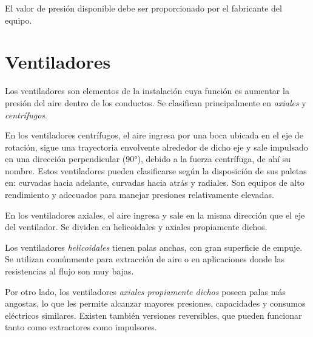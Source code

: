 El valor de presión disponible debe ser proporcionado por el fabricante del equipo.

\section{Ventiladores}

Los ventiladores son elementos de la instalación cuya función es aumentar la presión del aire dentro de los conductos. Se clasifican principalmente en \emph{axiales} y \emph{centrífugos}.

En los ventiladores centrífugos, el aire ingresa por una boca ubicada en el eje de rotación, sigue una trayectoria envolvente alrededor de dicho eje y sale impulsado en una dirección perpendicular (90°), debido a la fuerza centrífuga, de ahí su nombre. Estos ventiladores pueden clasificarse según la disposición de sus paletas en: curvadas hacia adelante, curvadas hacia atrás y radiales. Son equipos de alto rendimiento y adecuados para manejar presiones relativamente elevadas.

En los ventiladores axiales, el aire ingresa y sale en la misma dirección que el eje del ventilador. Se dividen en helicoidales y axiales propiamente dichos.

Los ventiladores \emph{helicoidales} tienen palas anchas, con gran superficie de empuje. Se utilizan comúnmente para extracción de aire o en aplicaciones donde las resistencias al flujo son muy bajas.

Por otro lado, los ventiladores \emph{axiales propiamente dichos} poseen palas más angostas, lo que les permite alcanzar mayores presiones, capacidades y consumos eléctricos similares. Existen también versiones reversibles, que pueden funcionar tanto como extractores como impulsores.